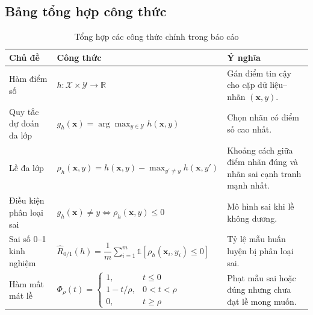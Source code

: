 \subsection{Bảng tổng hợp công thức}

\renewcommand{\arraystretch}{1.25}
\setlength{\tabcolsep}{5pt}

\begin{table}[H]
\centering
\small
\caption{Tổng hợp các công thức chính trong báo cáo}
\begin{tabular}{|>{\raggedright\arraybackslash}p{3.2cm}|>{\raggedright\arraybackslash}p{5.6cm}|>{\raggedright\arraybackslash}p{5.2cm}|}
\hline
\textbf{Chủ đề} & \textbf{Công thức} & \textbf{Ý nghĩa} \\
\hline
Hàm điểm số
& $h:\mathcal{X}\times\mathcal{Y}\to\mathbb{R}$
& Gán điểm tin cậy cho cặp dữ liệu--nhãn $(\bm{x},y)$. \\
\hline
Quy tắc dự đoán đa lớp
& $g_h(\bm{x})=\arg\max_{y\in\mathcal{Y}}h(\bm{x},y)$
& Chọn nhãn có điểm số cao nhất. \\
\hline
Lề đa lớp
& $\rho_h(\bm{x},y)=h(\bm{x},y)-\max_{y'\neq y}h(\bm{x},y')$
& Khoảng cách giữa điểm nhãn đúng và nhãn sai cạnh tranh mạnh nhất. \\
\hline
Điều kiện phân loại sai
& $g_h(\bm{x})\neq y\Longleftrightarrow \rho_h(\bm{x},y)\leq 0$
& Mô hình sai khi lề không dương. \\
\hline
Sai số 0--1 kinh nghiệm
& $\widehat{R}_{0/1}(h)=\dfrac{1}{m}\sum_{i=1}^{m}\mathbb{1}[\rho_h(\bm{x}_i,y_i)\leq0]$
& Tỷ lệ mẫu huấn luyện bị phân loại sai. \\
\hline
Hàm mất mát lề
& $\Phi_\rho(t)=\begin{cases}1,&t\leq0\\1-t/\rho,&0<t<\rho\\0,&t\geq\rho\end{cases}$
& Phạt mẫu sai hoặc đúng nhưng chưa đạt lề mong muốn. \\
\hline
\end{tabular}
\end{table}

